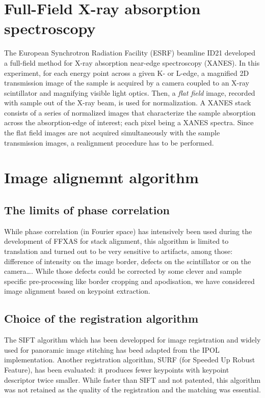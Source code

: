 \documentclass[preprint]{iucr}
\begin{document}
\section{Full-Field X-ray absorption spectroscopy}
The European Synchrotron Radiation Facility (ESRF) beamline ID21 developed a
full-field method for X-ray absorption near-edge spectroscopy\cite{fullfield}
(XANES). In this experiment, for each energy point across a given K- or L-edge,
a magnified 2D transmission image of the sample is acquired by a camera coupled
to an X-ray scintillator and magnifying visible light optics.
Then, a \emph{flat field} image, recorded with sample out of the X-ray beam, is
used for normalization.
A XANES stack consists of a series of normalized images that characterize the
sample absorption across the absorption-edge of interest; each pixel being a XANES spectra.
Since the flat field images are not acquired simultaneously with the sample
transmission images, a realignment procedure has to be performed.




\section{Image alignemnt algorithm}

\subsection{The limits of phase correlation}

While phase correlation (in Fourier space) has intensively been used during the
development of FFXAS for stack alignment, this algorithm is limited to
translation and turned out to be very sensitive to artifacts, among those:
difference of intensity on  the image border, defects on the scintillator or on
the camera\ldots.
While those defects could be corrected by some clever and sample
specific pre-processing like border cropping and apodisation, we have considered
image alignment based on keypoint extraction.

\subsection{Choice of the registration algorithm}

The SIFT algorithm \cite{Lowe1999,Lowe2004} which has been developped
for image registration and widely used for panoramic image stitching has beed
adapted from the IPOL\cite{ASIFT} implementation.
Another registration algorithm, SURF (for Speeded Up Robust Feature), has been
evaluated: it produces fewer keypoints with keypoint descriptor twice
smaller.
While faster than SIFT and not patented, this algorithm was not retained as the
quality of the registration and the matching was essential.
\end{document}
